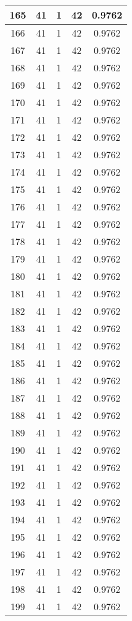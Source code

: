 \documentclass[letterpaper, 12pt]{article}
\begin{document}
\begin{longtable}{|c|c|c|c|c|}
\hline
165 & 41 & 1 & 42 & 0.9762 \\
\hline
166 & 41 & 1 & 42 & 0.9762 \\
\hline
167 & 41 & 1 & 42 & 0.9762 \\
\hline
168 & 41 & 1 & 42 & 0.9762 \\
\hline
169 & 41 & 1 & 42 & 0.9762 \\
\hline
170 & 41 & 1 & 42 & 0.9762 \\
\hline
171 & 41 & 1 & 42 & 0.9762 \\
\hline
172 & 41 & 1 & 42 & 0.9762 \\
\hline
173 & 41 & 1 & 42 & 0.9762 \\
\hline
174 & 41 & 1 & 42 & 0.9762 \\
\hline
175 & 41 & 1 & 42 & 0.9762 \\
\hline
176 & 41 & 1 & 42 & 0.9762 \\
\hline
177 & 41 & 1 & 42 & 0.9762 \\
\hline
178 & 41 & 1 & 42 & 0.9762 \\
\hline
179 & 41 & 1 & 42 & 0.9762 \\
\hline
180 & 41 & 1 & 42 & 0.9762 \\
\hline
181 & 41 & 1 & 42 & 0.9762 \\
\hline
182 & 41 & 1 & 42 & 0.9762 \\
\hline
183 & 41 & 1 & 42 & 0.9762 \\
\hline
184 & 41 & 1 & 42 & 0.9762 \\
\hline
185 & 41 & 1 & 42 & 0.9762 \\
\hline
186 & 41 & 1 & 42 & 0.9762 \\
\hline
187 & 41 & 1 & 42 & 0.9762 \\
\hline
188 & 41 & 1 & 42 & 0.9762 \\
\hline
189 & 41 & 1 & 42 & 0.9762 \\
\hline
190 & 41 & 1 & 42 & 0.9762 \\
\hline
191 & 41 & 1 & 42 & 0.9762 \\
\hline
192 & 41 & 1 & 42 & 0.9762 \\
\hline
193 & 41 & 1 & 42 & 0.9762 \\
\hline
194 & 41 & 1 & 42 & 0.9762 \\
\hline
195 & 41 & 1 & 42 & 0.9762 \\
\hline
196 & 41 & 1 & 42 & 0.9762 \\
\hline
197 & 41 & 1 & 42 & 0.9762 \\
\hline
198 & 41 & 1 & 42 & 0.9762 \\
\hline
199 & 41 & 1 & 42 & 0.9762 \\
\hline
\end{longtable}
\end{document}
